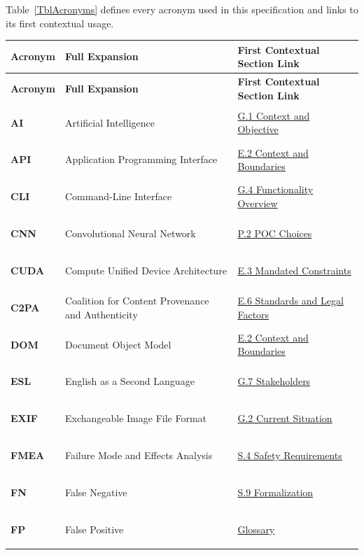 \documentclass[11pt]{article}
\begin{document}
Table~\ref{TblAcronyms} defines every acronym used in this specification and links to its first contextual usage.

{\small
\renewcommand{\arraystretch}{0.95}
\begin{tabularx}{\textwidth}{l P{6.0cm} Y}
\caption{Acronyms and Abbreviations} \label{TblAcronyms}\\
\toprule
\textbf{Acronym} & \textbf{Full Expansion} & \textbf{First Contextual Section Link}\\
\midrule
\endfirsthead
\toprule
\textbf{Acronym} & \textbf{Full Expansion} & \textbf{First Contextual Section Link}\\
\midrule
\endhead
\bottomrule
\endfoot
\hypertarget{acr-ai}{\textbf{AI}} & Artificial Intelligence & \hyperref[subsec:context-objective]{G.1 Context and Objective}\\
\hypertarget{acr-api}{\textbf{API}} & Application Programming Interface & \hyperref[subsec:env-components]{E.2 Context and Boundaries}\\
\hypertarget{acr-cli}{\textbf{CLI}} & Command-Line Interface & \hyperref[subsec:func-overview]{G.4 Functionality Overview}\\
\hypertarget{acr-cnn}{\textbf{CNN}} & Convolutional Neural Network & \hyperref[subsec:tech-choices]{P.2 POC Choices}\\
\hypertarget{acr-cuda}{\textbf{CUDA}} & Compute Unified Device Architecture & \hyperref[subsec:constraints]{E.3 Mandated Constraints}\\
\hypertarget{acr-c2pa}{\textbf{C2PA}} & Coalition for Content Provenance and Authenticity & \hyperref[subsec:standards-legal]{E.6 Standards and Legal Factors}\\
\hypertarget{acr-dom}{\textbf{DOM}} & Document Object Model & \hyperref[subsec:env-components]{E.2 Context and Boundaries}\\
\hypertarget{acr-esl}{\textbf{ESL}} & English as a Second Language & \hyperref[subsec:stakeholders]{G.7 Stakeholders}\\
\hypertarget{acr-exif}{\textbf{EXIF}} & Exchangeable Image File Format & \hyperref[subsec:current-situation]{G.2 Current Situation}\\
\hypertarget{acr-fmea}{\textbf{FMEA}} & Failure Mode and Effects Analysis & \hyperref[subsec:safety-reqs]{S.4 Safety Requirements}\\
\hypertarget{acr-fn}{\textbf{FN}} & False Negative & \hyperref[subsec:formalization]{S.9 Formalization}\\
\hypertarget{acr-fp}{\textbf{FP}} & False Positive & \hyperref[subsec:glossary]{Glossary}\\

\end{tabularx}}
\end{document}
